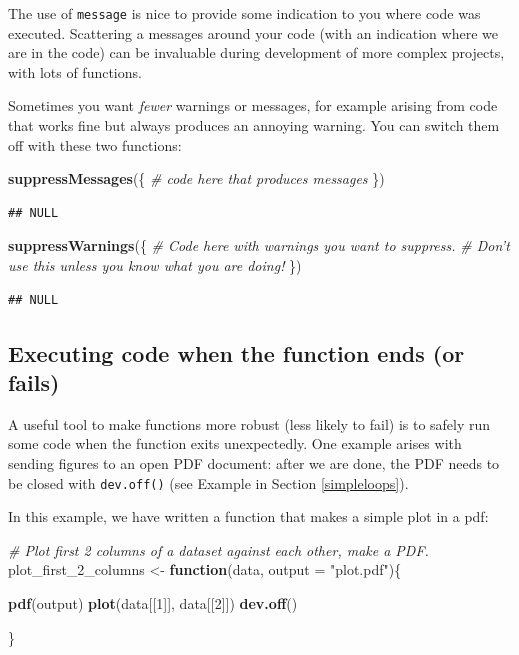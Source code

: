 \documentclass[]{book}
\newenvironment{Shaded}{\begin{snugshade}}{\end{snugshade}}
\newcommand{\CommentTok}[1]{\textcolor[rgb]{0.56,0.35,0.01}{\textit{#1}}}
\newcommand{\ControlFlowTok}[1]{\textcolor[rgb]{0.13,0.29,0.53}{\textbf{#1}}}
\newcommand{\DataTypeTok}[1]{\textcolor[rgb]{0.13,0.29,0.53}{#1}}
\newcommand{\DecValTok}[1]{\textcolor[rgb]{0.00,0.00,0.81}{#1}}
\newcommand{\KeywordTok}[1]{\textcolor[rgb]{0.13,0.29,0.53}{\textbf{#1}}}
\newcommand{\NormalTok}[1]{#1}
\newcommand{\StringTok}[1]{\textcolor[rgb]{0.31,0.60,0.02}{#1}}
\begin{document}
The use of \texttt{message} is nice to provide some indication to you where code was executed. Scattering a messages around your code (with an indication where we are in the code) can be invaluable during development of more complex projects, with lots of functions.

Sometimes you want \emph{fewer} warnings or messages, for example arising from code that works fine but always produces an annoying warning. You can switch them off with these two functions:

\begin{Shaded}
\begin{Highlighting}[]
\KeywordTok{suppressMessages}\NormalTok{(\{}
  \CommentTok{# code here that produces messages}
\NormalTok{\})}
\end{Highlighting}
\end{Shaded}

\begin{verbatim}
## NULL
\end{verbatim}

\begin{Shaded}
\begin{Highlighting}[]
\KeywordTok{suppressWarnings}\NormalTok{(\{}
  \CommentTok{# Code here with warnings you want to suppress.}
  \CommentTok{# Don't use this unless you know what you are doing!}
\NormalTok{\})}
\end{Highlighting}
\end{Shaded}

\begin{verbatim}
## NULL
\end{verbatim}

\hypertarget{onexit}{%
\subsection{Executing code when the function ends (or fails)}\label{onexit}}

A useful tool to make functions more robust (less likely to fail) is to safely run some code when the function exits unexpectedly. One example arises with sending figures to an open PDF document: after we are done, the PDF needs to be closed with \texttt{dev.off()} (see Example in Section \ref{simpleloops}).

In this example, we have written a function that makes a simple plot in a pdf:

\begin{Shaded}
\begin{Highlighting}[]
\CommentTok{# Plot first 2 columns of a dataset against each other, make a PDF.}
\NormalTok{plot_first_}\DecValTok{2}\NormalTok{_columns <-}\StringTok{ }\ControlFlowTok{function}\NormalTok{(data, }\DataTypeTok{output =} \StringTok{"plot.pdf"}\NormalTok{)\{}
  
  \KeywordTok{pdf}\NormalTok{(output)}
  \KeywordTok{plot}\NormalTok{(data[[}\DecValTok{1}\NormalTok{]], data[[}\DecValTok{2}\NormalTok{]])}
  \KeywordTok{dev.off}\NormalTok{()}
  
\NormalTok{\}}
\end{Highlighting}
\end{Shaded}
\end{document}
